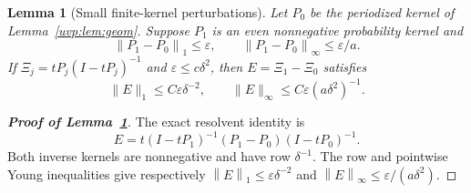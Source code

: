 \documentclass[11pt]{article}
\numberwithin{equation}{section}
\newtheorem{lemma}[theorem]{Lemma}
\theoremstyle{remark}
\newcommand{\norm}[1]{\left\|#1\right\|}
\begin{document}
\begin{lemma}[Small finite-kernel perturbations]\label{uvp:lem:perturb}
Let $P_0$ be the periodized kernel of Lemma~\ref{uvp:lem:geom}. Suppose
$P_1$ is an even nonnegative probability kernel and
\[
 \norm{P_1-P_0}_1\le\varepsilon,\qquad
 \norm{P_1-P_0}_\infty\le\varepsilon/a.
\]
If $\Xi_j=tP_j(I-tP_j)^{-1}$ and $\varepsilon\le c\delta^2$, then
$E=\Xi_1-\Xi_0$ satisfies
\begin{equation}\label{da:eq:abstract-kernel-error}
 \|E\|_1\le C\varepsilon\delta^{-2},\qquad
 \|E\|_\infty\le C\varepsilon(a\delta^2)^{-1}.
\end{equation}
\end{lemma}

\begin{proof}[\textbf{Proof of Lemma~\ref{uvp:lem:perturb}}]
The exact resolvent identity is
\[
 E=t(I-tP_1)^{-1}(P_1-P_0)(I-tP_0)^{-1}.
\]
Both inverse kernels are nonnegative and have row $\delta^{-1}$.
The row and pointwise Young inequalities give respectively
$\norm E_1\le\varepsilon\delta^{-2}$ and
$\norm E_\infty\le\varepsilon/(a\delta^2)$.
\end{proof}
\end{document}

